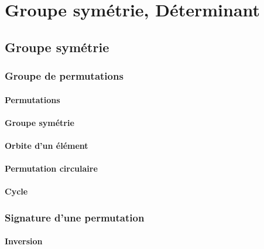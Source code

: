 \chapter{Groupe symétrie, Déterminant} %
\label{chap:Groupe symétrie, Déterminant}

\section{Groupe symétrie} %
\label{sec:Groupe symétrie}

\subsection{Groupe de permutations} %
\label{sub:Groupe de permutations}

\subsubsection{Permutations} %
\label{sec:Permutations}

\subsubsection{Groupe symétrie} %
\label{sec:Groupe symétrie}

\subsubsection{Orbite d'un élément} %
\label{sec:Orbite d'un élément}

\subsubsection{Permutation circulaire} %
\label{sec:Permutation circulaire}

\subsubsection{Cycle} %
\label{sec:Cycle}

\subsection{Signature d'une permutation} %
\label{sub:Signature d'une permutation}

\subsubsection{Inversion} %
\label{sec:Inversion}


